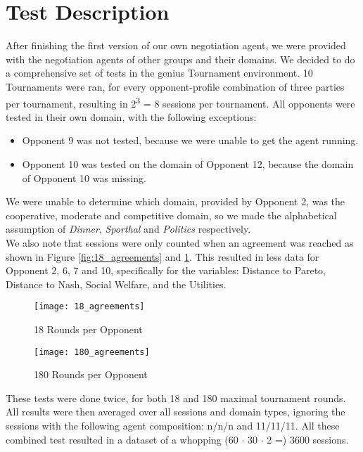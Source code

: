 \section{Test Description}

After finishing the first version of our own negotiation agent, we were provided with the negotiation agents of other groups and their domains. We decided to do a comprehensive set of tests in the genius Tournament environment. 10 Tournaments were ran, for every opponent-profile combination of three parties per tournament, resulting in 2\textsuperscript{3} = 8 sessions per tournament. All opponents were tested in their own domain, with the following exceptions:

\begin{itemize}
	\item Opponent 9 was not tested, because we were unable to get the agent running. 
	\item Opponent 10 was tested on the domain of Opponent 12, because the domain of Opponent 10 was missing.
\end{itemize}

We were unable to determine which domain, provided by Opponent 2, was the cooperative, moderate and competitive domain, so we made the alphabetical assumption of \textit{Dinner}, \textit{Sporthal} and \textit{Politics} respectively. \\

We also note that sessions were only counted when an agreement was reached as shown in Figure \ref{fig:18_agreements} and \ref{fig:180_agreements}. This resulted in less data for Opponent 2, 6, 7 and 10, specifically for the variables: Distance to Pareto, Distance to Nash, Social Welfare, and the Utilities.

\begin{figure}[!htb]
	\texttt{[image: 18\_agreements]}
	\caption{18 Rounds per Opponent}
	\label{fig:18_agreements}
	\endminipage\hfill
	\texttt{[image: 180\_agreements]}
	\caption{180 Rounds per Opponent}
	\label{fig:180_agreements}
	\endminipage\hfill
\end{figure}

These tests were done twice, for both 18 and 180 maximal tournament rounds.
All results were then averaged over all sessions and domain types, ignoring the sessions with the following agent composition: n/n/n and 11/11/11. All these combined test resulted in a dataset of a whopping (60 $\cdot$ 30 $\cdot$ 2 =) 3600 sessions.
